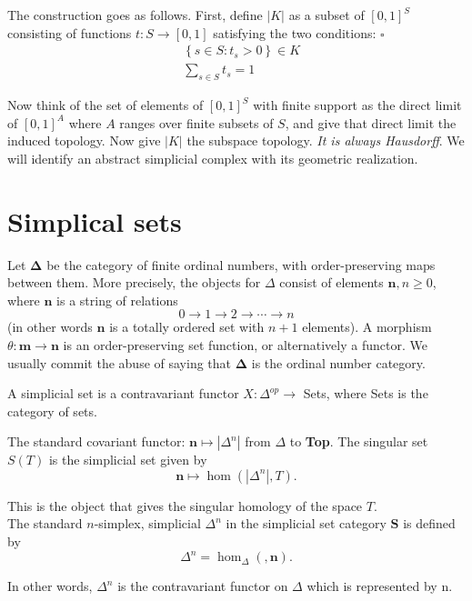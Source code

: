 The construction goes as follows. First, define $|K|$ as a subset of $[0,1]^S$ consisting of functions $t: S \rightarrow[0,1]$ satisfying the two conditions: $\square$
$$
\begin{aligned}
& \left\{s \in S: t_s>0\right\} \in K \\
& \sum_{s \in S} t_s=1
\end{aligned}
$$

Now think of the set of elements of $[0,1]^S$ with finite support as the direct limit of $[0,1]^A$ where $A$ ranges over finite subsets of $S$, and give that direct limit the induced topology. Now give $|K|$ the subspace topology. \textit{It is always Hausdorff}. We will identify an abstract simplicial complex with its geometric realization.





\section{Simplical sets}



Let $\mathbf{\Delta}$ be the category of finite ordinal numbers, with order-preserving maps between them. More precisely, the objects for $\Delta$ consist of elements $\mathbf{n}, n \geq 0$, where $\mathbf{n}$ is a string of relations
$$
0 \rightarrow 1 \rightarrow 2 \rightarrow \cdots \rightarrow n
$$
(in other words $\mathbf{n}$ is a totally ordered set with $n+1$ elements). A morphism $\theta: \mathbf{m} \rightarrow \mathbf{n}$ is an order-preserving set function, or alternatively a functor. We usually commit the abuse of saying that $\mathbf{\Delta}$ is the ordinal number category.

A simplicial set is a contravariant functor $X: \Delta^{o p} \rightarrow$ Sets, where Sets is the category of sets.

\begin{rema}
    The standard covariant functor: $\mathbf{n} \mapsto |\Delta^n| $ from $\Delta$ to \textbf{Top}. The singular set $S(T)$ is the simplicial set given by
    $$
    \mathbf{n} \mapsto \operatorname{hom}\left(\left|\Delta^n\right|, T\right) .
    $$
    
    This is the object that gives the singular homology of the space $T$.\\

    The standard $n$-simplex, simplicial $\Delta^n$ in the simplicial set category $\mathbf{S}$ is defined by
$$
\Delta^n=\operatorname{hom}_{\Delta}(, \mathbf{n}) .
$$

In other words, $\Delta^n$ is the contravariant functor on $\Delta$ which is represented by n.
\end{rema}

